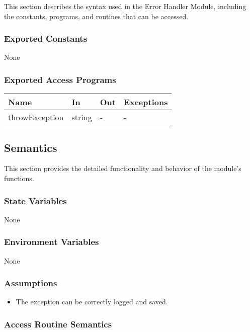 \documentclass[12pt, titlepage]{article}
\begin{document}
This section describes the syntax used in the Error Handler Module, including
the constants, programs, and routines that can be accessed.

\subsubsection{Exported Constants}

None

\subsubsection{Exported Access Programs}

\begin{center}
\begin{tabular}{p{3cm} p{4cm} p{4cm} p{2cm}}
\hline
\textbf{Name} & \textbf{In} & \textbf{Out} & \textbf{Exceptions} \\
\hline
throwException & string & - & - \\
\hline
\end{tabular}
\end{center}

\subsection{Semantics}

This section provides the detailed functionality and behavior of the module’s
functions.

\subsubsection{State Variables}

None

\subsubsection{Environment Variables}

None

\subsubsection{Assumptions}

\begin{itemize}
\item The exception can be correctly logged and saved.
\end{itemize}

\subsubsection{Access Routine Semantics}
\end{document}
